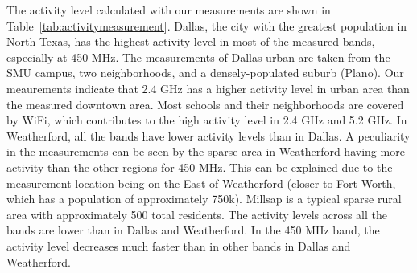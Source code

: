 The activity level calculated with our measurements are shown in Table~\ref{tab:activitymeasurement}.
Dallas, the city with the greatest population in North Texas, has the highest activity level in most 
of the measured bands, especially at 450 MHz. The measurements of Dallas urban are taken from the SMU 
campus, two neighborhoods, and a densely-populated suburb (Plano). Our meaurements indicate that 2.4 GHz 
has a higher activity level in urban area than the measured downtown area. Most schools and their 
neighborhoods are covered by WiFi, which contributes to the high activity level in 2.4 GHz and 5.2 GHz.
In Weatherford, all the bands have lower activity levels than in Dallas. A peculiarity in the measurements
can be seen by the sparse area in Weatherford having more activity than the other regions for 450 MHz.  
This can be explained due to the measurement location being on the East of Weatherford (closer to Fort Worth,
which has a population of approximately 750k).
Millsap is a typical sparse rural area with approximately 500 total residents. The activity levels across 
all the bands are lower than in Dallas and Weatherford. In the 450 MHz band, the activity level decreases 
much faster than in other bands in Dallas and Weatherford. 


